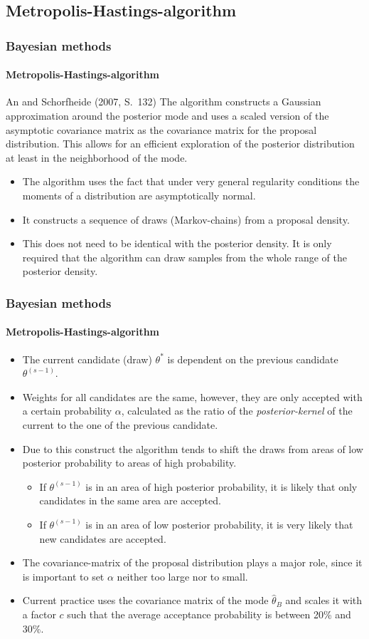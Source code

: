 \documentclass[handout]{beamer}  %
\begin{document}
\subsection{Metropolis-Hastings-algorithm}
\begin{frame}\frametitle{Bayesian methods}\framesubtitle{Metropolis-Hastings-algorithm}
\begin{block}{An and Schorfheide (2007, S.~132)}
  The algorithm constructs a Gaussian approximation around the posterior mode and
  uses a scaled version of the asymptotic covariance matrix as the covariance
  matrix for the proposal distribution. This allows for an efficient
  exploration of the posterior distribution at least in the neighborhood of
  the mode.
\end{block}
\begin{itemize}
  \item The algorithm uses the fact that under very general regularity conditions the moments of a distribution are asymptotically normal.
\item It constructs a sequence of draws (Markov-chains) from a proposal density.
\item This does not need to be identical with the posterior density. It is only required that the algorithm can draw samples from the whole range of the posterior density.
\end{itemize}
\end{frame}


\begin{frame}\frametitle{Bayesian methods}\framesubtitle{Metropolis-Hastings-algorithm}
\begin{itemize}
  \item The current candidate (draw) ${\theta^*}$ is dependent on the previous candidate ${\theta^{(s-1)}}$.
  \item Weights for all candidates are the same, however, they are only accepted with a certain probability $\alpha$, calculated as the ratio of the \emph{posterior-kernel} of the current to the one of the previous candidate.
  \item Due to this construct the algorithm tends to shift the draws from areas of low posterior probability to areas of high probability.
  \begin{itemize}
    \item If ${\theta^{(s-1)}}$ is in an area of high posterior probability, it is likely that only candidates in the same area are accepted.
    \item If ${\theta^{(s-1)}}$ is in an area of low posterior probability, it is very likely that new candidates are accepted.
  \end{itemize}
\item The covariance-matrix of the proposal distribution plays a major role, since it is important to set $\alpha$ neither too large nor to small.
\item Current practice uses the covariance matrix of the mode ${\widehat{\theta}_B}$ and scales it with a factor $c$ such that the average acceptance probability is between 20\% and 30\%.
\end{itemize}

\end{frame}
\end{document}
